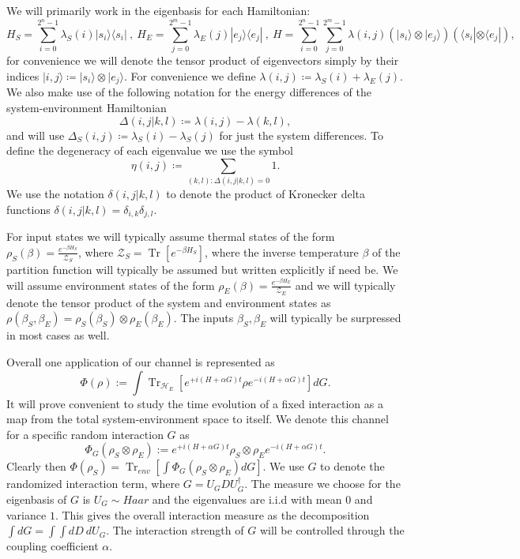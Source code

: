 \documentclass{article}
\newcommand{\ket}[1]{|#1\rangle}
\newcommand{\bra}[1]{\langle #1|}
\newcommand{\ketbra}[2]{| #1\rangle\! \langle #2|}
\newcommand{\brackets}[1]{\left[ #1 \right]}
\DeclareMathOperator{\Tr}{Tr}
\newcommand{\trace}[1]{\Tr \brackets{ #1 }}
\newcommand{\partrace}[2]{\Tr_{#1} \brackets{ #2 }}
\newcommand{\hilb}{\mathcal{H}}
\newcommand{\partfun}{\mathcal{Z}}
\begin{document}
We will primarily work in the eigenbasis for each Hamiltonian:
\begin{equation}
    H_{S} = \sum_{i = 0}^{2^n - 1} \lambda_S(i) \ketbra{s_i}{s_i} ~,~ H_{E} = \sum_{j=0}^{2^m - 1} \lambda_E(j) \ketbra{e_j}{e_j} ~,~ H = \sum_{i=0}^{2^n - 1} \sum_{j=0}^{2^m - 1} \lambda(i,j) (\ket{s_i} \otimes \ket{e_j})(\bra{s_i} \otimes \bra{e_j}),
\end{equation}
for convenience we will denote the tensor product of eigenvectors simply by their indices $\ket{i,j} \coloneqq \ket{s_i} \otimes \ket{e_j}$. For convenience we define $\lambda(i,j) \coloneqq \lambda_S(i) + \lambda_E(j)$. We also make use of the following notation for the energy differences of the system-environment Hamiltonian
$$\Delta(i,j|k,l) \coloneqq \lambda(i,j) - \lambda(k,l),$$
and will use $\Delta_S(i,j) \coloneqq \lambda_S(i) - \lambda_S(j)$ for just the system differences. To define the degeneracy of each eigenvalue we use the symbol
$$\eta(i,j) \coloneqq \sum_{(k,l) : \Delta(i,j|k,l) = 0} 1.$$ We use the notation $\delta(i,j|k,l)$ to denote the product of Kronecker delta functions $\delta(i,j|k,l) = \delta_{i,k} \delta_{j,l}$.

For input states we will typically assume thermal states of the form $\rho_S(\beta) = \frac{e^{-\beta H_S}}{\partfun_S}$, where $\partfun_S = \trace{e^{-\beta H_S}}$, where the inverse temperature $\beta$ of the partition function will typically be assumed but written explicitly if need be. We will assume environment states of the form $\rho_E(\beta) = \frac{e^{-\beta H_E}}{\partfun_E}$ and we will typically denote the tensor product of the system and environment states as $\rho(\beta_S, \beta_E) = \rho_S(\beta_S) \otimes \rho_E(\beta_E)$. The inputs $\beta_S, \beta_E$ will typically be surpressed in most cases as well.


Overall one application of our channel is represented as
\begin{equation}
    \Phi(\rho) := \int \partrace{\hilb_E}{e^{+i(H + \alpha G)t} \rho e^{-i(H + \alpha G) t}} dG.
\end{equation}
It will prove convenient to study the time evolution of a fixed interaction as a map from the total system-environment space to itself. We denote this channel for a specific random interaction $G$ as
\begin{equation}
    \Phi_G(\rho_S \otimes \rho_E) := e^{+i (H+ \alpha G) t} \rho_S \otimes \rho_E e^{-i (H + \alpha G) t}. \label{eq:phi_g_definition}
\end{equation}
Clearly then $\Phi(\rho_S) = \partrace{env}{\int \Phi_G (\rho_S \otimes \rho_E) dG}$. We use $G$ to denote the randomized interaction term, where $G = U_G D U_G^\dagger$. The measure we choose for the eigenbasis of $G$ is $U_G \sim Haar$ and the eigenvalues are i.i.d with mean 0 and variance $1$.  This gives the overall interaction measure as the decomposition $\int dG = \int \int dD ~ dU_G$. The interaction strength of $G$ will be controlled through the coupling coefficient $\alpha$.
\end{document}
